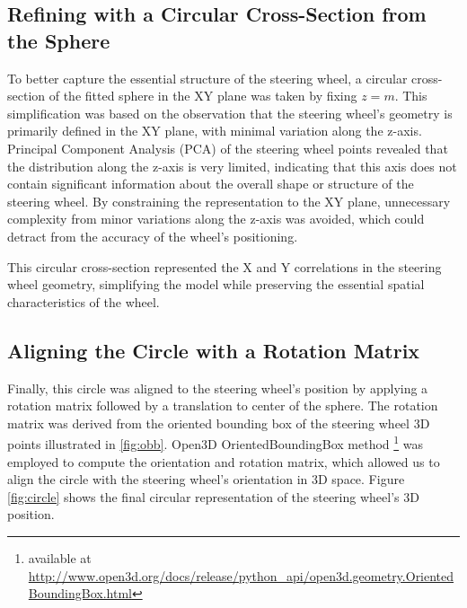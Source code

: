 \subsection{Refining with a Circular Cross-Section from the Sphere}
To better capture the essential structure of the steering wheel, a circular cross-section of the fitted sphere in the XY plane was taken by fixing \( z = m \). This simplification was based on the observation that the steering wheel’s geometry is primarily defined in the XY plane, with minimal variation along the z-axis. 
Principal Component Analysis (PCA) of the steering wheel points 
revealed that the distribution along the z-axis is very limited, 
indicating that this axis does not contain significant information 
about the overall shape or structure of the steering wheel. 
By constraining the representation to the XY plane, unnecessary complexity from minor variations along 
the z-axis was avoided, which could detract from the accuracy of the wheel’s positioning.

This circular cross-section represented the X and Y 
correlations in the steering wheel geometry, 
simplifying the model while preserving the essential spatial 
characteristics of the wheel.


\subsection{Aligning the Circle with a Rotation Matrix}
Finally, this circle was aligned to the steering wheel’s position 
by applying a rotation matrix followed by a translation 
to center of the sphere. The rotation matrix was derived 
from the oriented bounding box of the steering wheel 3D points 
illustrated in \cref{fig:obb}. Open3D OrientedBoundingBox method 
\footnote{available at \url{http://www.open3d.org/docs/release/python_api/open3d.geometry.OrientedBoundingBox.html}}
was employed to compute the orientation and rotation matrix, 
which allowed us to align the circle with the steering 
wheel’s orientation in 3D space. 
Figure \cref{fig:circle} shows the final circular representation of the steering wheel's 3D position.

